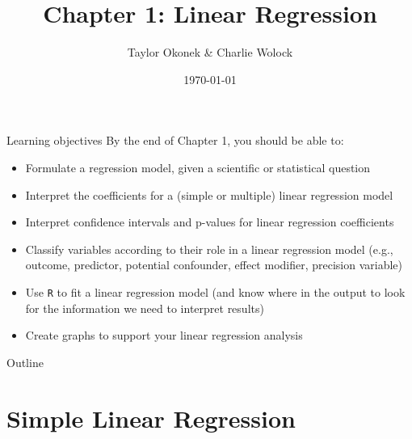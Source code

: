 \documentclass[10pt,t]{beamer}
\title{Chapter 1: Linear Regression}
\author{Taylor Okonek \& Charlie Wolock}
\date{\today}
\begin{document}
	\begin{frame}
	\titlepage 
\end{frame}

\begin{frame}{Learning objectives}
By the end of Chapter 1, you should be able to:
\begin{itemize}
	\item Formulate a regression model, given a scientific or statistical question
	\item Interpret the coefficients for a (simple or multiple) linear regression model
	\item Interpret confidence intervals and p-values for linear regression coefficients
	\item Classify variables according to their role in a linear regression model (e.g., outcome, predictor, potential confounder, effect modifier, precision variable)
	\item Use \texttt{R} to fit a linear regression model (and know where in the output to look for the information we need to interpret results)
	\item Create graphs to support your linear regression analysis
\end{itemize}
\end{frame}

\begin{frame}{Outline}
\tableofcontents
\end{frame}


\section{Simple Linear Regression}
\end{document}
